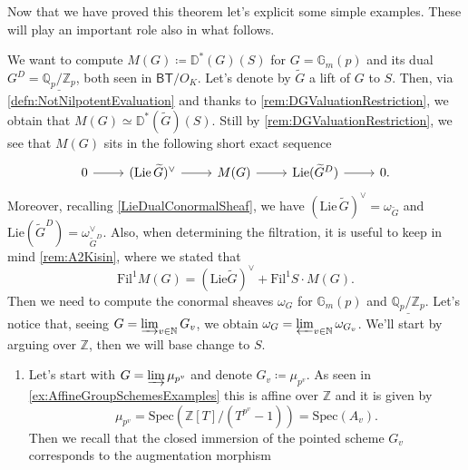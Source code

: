 \noindent
Now that we have proved this theorem let's explicit some simple examples.
These will play an important role also in what follows.
\begin{ex}[]\label{DieudonneModulesSimpleExamples}
	We want to compute $M(G) \coloneqq \mathbb{D}^*(G)(S)$ for
	$G = \mathbb{G}_m(p)$ and its dual 
	$G^D = \underline{\mathbb{Q}_p/\mathbb{Z}_{p}}$,
	both seen in $\mathsf{BT}/O_K$.
	Let's denote by $\widetilde{G}$ a lift of $G$ to $S$.
	Then, via \cref{defn:NotNilpotentEvaluation} and thanks to \cref{rem:DGValuationRestriction},
	we obtain that $M(G) \simeq \mathbb{D}^*(\widetilde{G})(S)$.
	Still by \cref{rem:DGValuationRestriction}, we see that $M(G)$
	sits in the following short exact sequence
	\begin{equation}\label{eqn:MGSES}
	\begin{tikzcd}
		0 \arrow[r, "", rightarrow] &
		( \mathrm{Lie}\, \widetilde{G} )^\vee \arrow[r, "", rightarrow] &
		M(G) \arrow[r, "", rightarrow] &
		\mathrm{Lie}(\widetilde{G}^D) \arrow[r, "", rightarrow] &
		0
	.\end{tikzcd}
	\end{equation}
	Moreover, recalling \cref{LieDualConormalSheaf}, we have
	$(\mathrm{Lie}\, \widetilde{G})^\vee = \omega_{\widetilde{G}}$ and
	$\mathrm{Lie}(\widetilde{G}^D) = \omega_{\widetilde{G}^D}^\vee$.
	Also, when determining the filtration, it is useful to keep
	in mind \cref{rem:A2Kisin}, where we stated that 
	\begin{equation*}
		\mathrm{Fil}^1 M(G) =
		( \mathrm{Lie} \widetilde{G} )^\vee +
		\mathrm{Fil}^1S \cdot M(G)
	.\end{equation*}
	Then we need to compute the conormal sheaves $\omega_G$ for $\mathbb{G}_m(p)$
	and $\underline{\mathbb{Q}_p/\mathbb{Z}_{p}}$.
	Let's notice that, seeing $G = \varinjlim_{v \in \mathbb{N}} G_v$, we
	obtain $\omega_G = \varprojlim_{v \in \mathbb{N}} \omega_{G_v}$.
	We'll start by arguing over $\mathbb{Z}$, then we will base change
	to $S$.
\begin{enumerate}
	\item Let's start with $G = \varinjlim \mu_{p^v}$ and denote $G_v \coloneqq \mu_{p^v}$.
		As seen in \cref{ex:AffineGroupSchemesExamples} this is affine over
		$\mathbb{Z}$ and it is given by
		\begin{equation*}
			\mu_{p^v} = \mathrm{Spec}(\mathbb{Z}[T]/ (T^{p^v} - 1)) = \mathrm{Spec}(A_v)
		.\end{equation*}
		Then we recall that the closed immersion of the pointed
		scheme $G_v$ corresponds to the augmentation morphism

\end{enumerate}
\end{ex}
